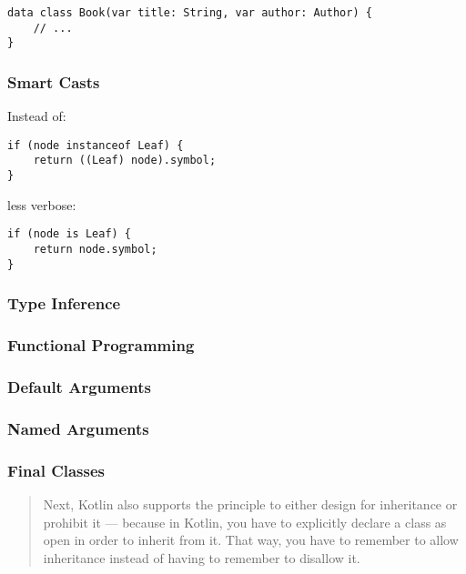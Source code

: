 \documentclass[a4paper,12pt]{article}
\begin{document}
\begin{verbatim}
data class Book(var title: String, var author: Author) {
    // ...
}	
\end{verbatim}

\subsubsection{Smart Casts}

Instead of:

\begin{verbatim}
if (node instanceof Leaf) {
    return ((Leaf) node).symbol;
}	
\end{verbatim}

less verbose:

\begin{verbatim}
if (node is Leaf) {
    return node.symbol;
}	
\end{verbatim}

\subsubsection{Type Inference}

\subsubsection{Functional Programming}

\subsubsection{Default Arguments}

\subsubsection{Named Arguments}

\subsubsection{Final Classes}

\begin{quotation}
Next, Kotlin also supports the principle to either design for inheritance or prohibit it — because in Kotlin, you have to explicitly declare a class as open in order to inherit from it. That way, you have to remember to allow inheritance instead of having to remember to disallow it.\cite{kotlin-sommerhoff}
\end{quotation}
\end{document}
